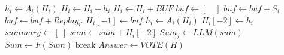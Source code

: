 \begin{breakablealgorithm}
\begin{algorithmic}[1]
                            \State $h_i \gets A_i(H_i)$ %
                            \State $H_i \gets H_i + h_i$ %
                            \State $H_i \gets H_i + BUF$ 
                        \Else
                            \State $buf \gets [\quad]$
                                        \State $buf \gets buf + S_i$ %
                                    \EndIf
                                \EndFor
                            \Else
                                        \State $buf \gets buf + Replay_{i'}$  
                                    \EndIf
                                \EndFor
                            \EndIf
                                \State $H_i[-1] \gets buf$ 
                                \State $h_i \gets A_i(H_i)$ 
                                \State $H_i[-2] \gets h_i$   %
                            \EndIf
                        \EndIf
                    \EndFor
                \EndFor
                    \State $summary \gets [\;]$
                        \State $sum \gets sum + H_i[-2]$         
                    \EndFor
                    \State $Sum_j \gets LLM(sum)$ 
                \EndIf 
            \EndFor
            \State $Sum \gets F(Sum)$%
                break
            \EndIf                
        \EndFor
        \State $Answer \gets VOTE(H)$
        

\end{algorithmic}
\end{breakablealgorithm}
